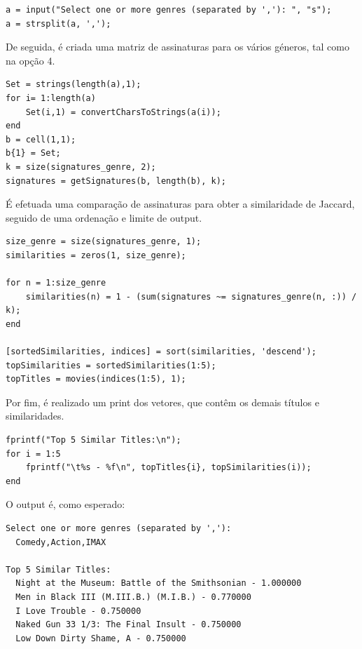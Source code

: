 \documentclass[portuguese, 11pt, a4paper,titlepage, oneside]{article}
\begin{document}
\begin{lstlisting}[style=Matlab-editor]
a = input("Select one or more genres (separated by ','): ", "s");
a = strsplit(a, ',');
\end{lstlisting}

De seguida, é criada uma matriz de assinaturas para os vários géneros, tal como na opção 4.
\begin{lstlisting}[style=Matlab-editor]
Set = strings(length(a),1);
for i= 1:length(a)
    Set(i,1) = convertCharsToStrings(a(i));
end
b = cell(1,1);
b{1} = Set;
k = size(signatures_genre, 2);
signatures = getSignatures(b, length(b), k);
\end{lstlisting}

É efetuada uma comparação de assinaturas para obter a similaridade de Jaccard, seguido de uma ordenação e limite de output.
\begin{lstlisting}[style=Matlab-editor]
size_genre = size(signatures_genre, 1);
similarities = zeros(1, size_genre);

for n = 1:size_genre
    similarities(n) = 1 - (sum(signatures ~= signatures_genre(n, :)) / k);
end

[sortedSimilarities, indices] = sort(similarities, 'descend');
topSimilarities = sortedSimilarities(1:5);
topTitles = movies(indices(1:5), 1);
\end{lstlisting}

Por fim, é realizado um print dos vetores, que contêm os demais títulos e similaridades.
\begin{lstlisting}[style=Matlab-editor]
fprintf("Top 5 Similar Titles:\n");
for i = 1:5
    fprintf("\t%s - %f\n", topTitles{i}, topSimilarities(i));
end
\end{lstlisting}

O output é, como esperado:
\begin{lstlisting}[style=Matlab-editor]
Select one or more genres (separated by ','): 
  Comedy,Action,IMAX

Top 5 Similar Titles:
  Night at the Museum: Battle of the Smithsonian - 1.000000
  Men in Black III (M.III.B.) (M.I.B.) - 0.770000
  I Love Trouble - 0.750000
  Naked Gun 33 1/3: The Final Insult - 0.750000
  Low Down Dirty Shame, A - 0.750000
\end{lstlisting}
\end{document}
